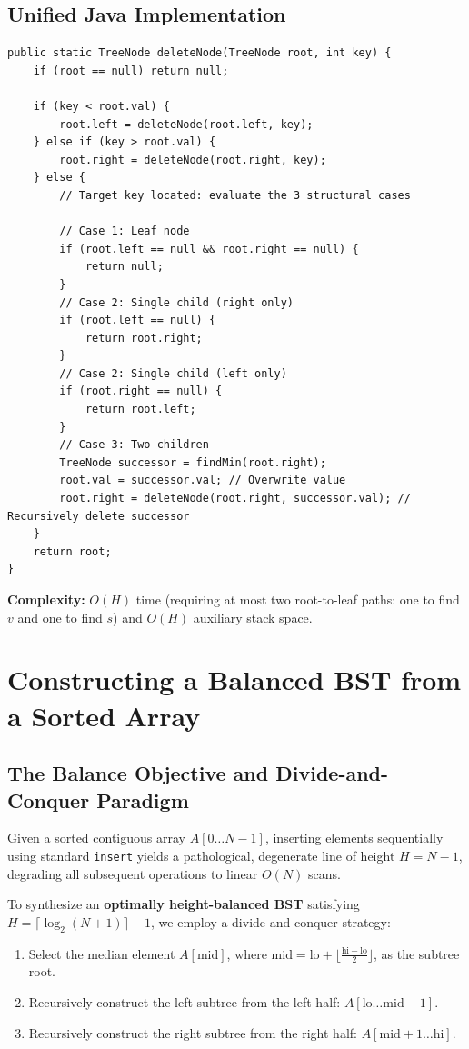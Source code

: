 \documentclass[10pt,journal,compsoc,onecolumn]{IEEEtran}
\begin{document}
\subsection{Unified Java Implementation}
\begin{verbatim}
public static TreeNode deleteNode(TreeNode root, int key) {
    if (root == null) return null;

    if (key < root.val) {
        root.left = deleteNode(root.left, key);
    } else if (key > root.val) {
        root.right = deleteNode(root.right, key);
    } else {
        // Target key located: evaluate the 3 structural cases

        // Case 1: Leaf node
        if (root.left == null && root.right == null) {
            return null;
        }
        // Case 2: Single child (right only)
        if (root.left == null) {
            return root.right;
        }
        // Case 2: Single child (left only)
        if (root.right == null) {
            return root.left;
        }
        // Case 3: Two children
        TreeNode successor = findMin(root.right);
        root.val = successor.val; // Overwrite value
        root.right = deleteNode(root.right, successor.val); // Recursively delete successor
    }
    return root;
}
\end{verbatim}

\textbf{Complexity:} $O(H)$ time (requiring at most two root-to-leaf paths: one to find $v$ and one to find $s$) and $O(H)$ auxiliary stack space.

\section{Constructing a Balanced BST from a Sorted Array}
\label{sec:construct}

\subsection{The Balance Objective and Divide-and-Conquer Paradigm}

Given a sorted contiguous array $A[0 \dots N-1]$, inserting elements sequentially using standard \texttt{insert} yields a pathological, degenerate line of height $H = N - 1$, degrading all subsequent operations to linear $O(N)$ scans.

To synthesize an \textbf{optimally height-balanced BST} satisfying $H = \lceil \log_2(N + 1) \rceil - 1$, we employ a divide-and-conquer strategy:
\begin{enumerate}
    \item Select the median element $A[\mathrm{mid}]$, where $\mathrm{mid} = \mathrm{lo} + \lfloor \frac{\mathrm{hi} - \mathrm{lo}}{2} \rfloor$, as the subtree root.
    \item Recursively construct the left subtree from the left half: $A[\mathrm{lo} \dots \mathrm{mid} - 1]$.
    \item Recursively construct the right subtree from the right half: $A[\mathrm{mid} + 1 \dots \mathrm{hi}]$.
\end{enumerate}
\end{document}

